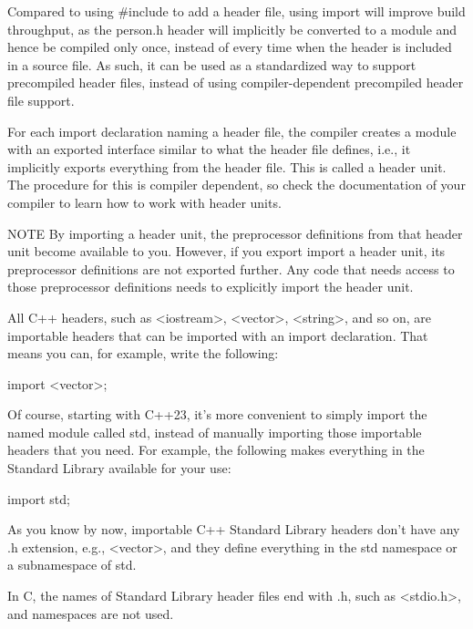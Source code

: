 Compared to using \#include to add a header file, using import will improve build throughput, as the person.h header will implicitly be converted to a module and hence be compiled only once, instead of every time when the header is included in a source file. As such, it can be used as a standardized way to support precompiled header files, instead of using compiler-dependent precompiled header file support.

For each import declaration naming a header file, the compiler creates a module with an exported interface similar to what the header file defines, i.e., it implicitly exports everything from the header file. This is called a header unit. The procedure for this is compiler dependent, so check the documentation of your compiler to learn how to work with header units.

\begin{myNotic}{NOTE}
By importing a header unit, the preprocessor definitions from that header unit become available to you. However, if you export import a header unit, its preprocessor definitions are not exported further. Any code that needs access to those preprocessor definitions needs to explicitly import the header unit.
\end{myNotic}


All C++ headers, such as <iostream>, <vector>, <string>, and so on, are importable headers that can be imported with an import declaration. That means you can, for example, write the following:

\begin{cpp}
import <vector>;
\end{cpp}

Of course, starting with C++23, it’s more convenient to simply import the named module called std, instead of manually importing those importable headers that you need. For example, the following makes everything in the Standard Library available for your use:

\begin{cpp}
import std;
\end{cpp}

As you know by now, importable C++ Standard Library headers don’t have any .h extension, e.g., <vector>, and they define everything in the std namespace or a subnamespace of std.

In C, the names of Standard Library header files end with .h, such as <stdio.h>, and namespaces are not used.

